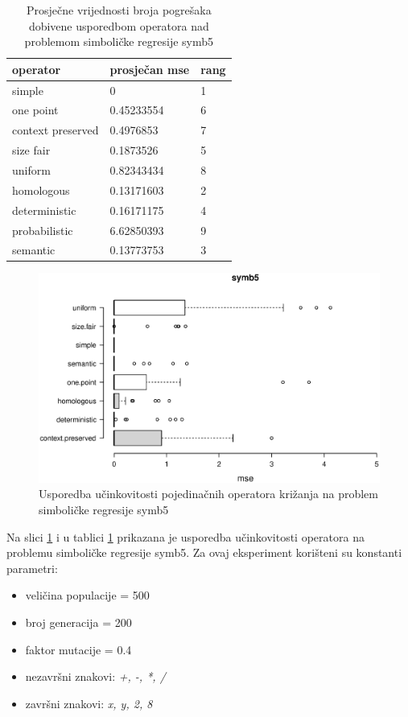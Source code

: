 \begin{table}[H]
 	\centering
 \caption{Prosječne vrijednosti broja pogrešaka dobivene usporedbom operatora nad problemom simboličke regresije symb5}
 
    \begin{tabular}{| l | l | l |}
    \hline
    \textbf{operator} & \textbf{prosječan mse} & \textbf{rang}\\ \hline
    simple & 0 & 1\\ \hline
    one point & 0.45233554 & 6\\ \hline
    context preserved & 0.4976853 & 7\\ \hline
    size fair & 0.1873526 & 5\\ \hline
    uniform & 0.82343434 & 8\\ \hline
    homologous & 0.13171603 & 2\\ \hline
    deterministic & 0.16171175 & 4\\ \hline
    probabilistic & 6.62850393 & 9\\ \hline
    semantic & 0.13773753 & 3\\ \hline
    \end{tabular}
    
   
    \label{symb5table}
\end{table}

\begin{figure}[H]
	\centering
	\includegraphics[trim=0cm 4cm 0cm 0cm, scale=0.6]{./slike/boxPlots/symb5.eps}
	\caption{Usporedba učinkovitosti pojedinačnih operatora križanja na problem simboličke regresije symb5}
	\label{symb5box}
\end{figure}


Na slici \ref{symb5box} i u tablici \ref{symb5table} prikazana je usporedba učinkovitosti operatora na problemu simboličke regresije symb5. Za ovaj eksperiment korišteni su konstanti parametri:
\begin{itemize}
\item{veličina populacije = 500}
\item{broj generacija = 200}
\item{faktor mutacije = 0.4}
\item{nezavršni znakovi: \textit{+, -, *, /}}
\item{završni znakovi: \textit{x, y, 2, 8}}
\end{itemize} 

